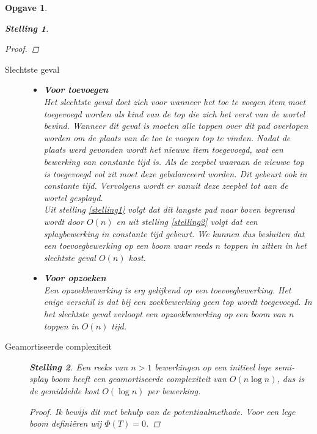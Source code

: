 \documentclass[12pt,hidelinks]{article}
\newtheorem{opgave}{Opgave}
\newtheorem{stelling}{Stelling}
\newcommand{\newln}{~\\\vspace{0.5em}}
\begin{document}
\begin{opgave}
\begin{stelling}
\begin{proof}
            \end{proof}
        \end{stelling}
        \begin{description}
            \item[Slechtste geval]
                \hfill
                \begin{itemize}
                    \item \textbf{Voor toevoegen}\\
                        Het slechtste geval doet zich voor wanneer het toe te voegen item moet toegevoegd worden als kind van de top die zich het verst van de wortel bevind. 
                        Wanneer dit geval is moeten alle toppen over dit pad overlopen worden om de plaats van de toe te voegen top te vinden.
                        Nadat de plaats werd gevonden wordt het nieuwe item toegevoegd, wat een bewerking van constante tijd is.
                        Als de zeepbel waaraan de nieuwe top is toegevoegd vol zit moet deze gebalanceerd worden. Dit gebeurt ook in constante tijd.
                        Vervolgens wordt er vanuit deze zeepbel tot aan de wortel gesplayd.
                        \newln
                        Uit stelling \ref{stelling1} volgt dat dit langste pad naar boven begrensd wordt door $O(n)$ en uit stelling \ref{stelling2} volgt dat een splaybewerking in constante tijd gebeurt.
                        We kunnen dus besluiten dat een toevoegbewerking op een boom waar reeds $n$ toppen in zitten in het slechtste geval $O(n)$ kost.
                    \item \textbf{Voor opzoeken}\\
                        Een opzoekbewerking is erg gelijkend op een toevoegbewerking. 
                        Het enige verschil is dat bij een zoekbewerking geen top wordt toegevoegd.
                        In het slechtste geval verloopt een opzoekbewerking op een boom van $n$ toppen in $O(n)$ tijd.
                \end{itemize}
            \item[Geamortiseerde complexiteit]
                \hfill
                \begin{stelling}
                    Een reeks van $n > 1$ bewerkingen op een initieel lege semi-splay boom heeft een geamortiseerde complexiteit van $O(n \log n)$, dus is de gemiddelde kost $O(\log n)$ per bewerking.
                    \begin{proof}
                        Ik bewijs dit met behulp van de potentiaalmethode. Voor een lege boom definiëren wij $\Phi(T)=0$.

\end{proof}
\end{stelling}
\end{description}
\end{opgave}
\end{document}
